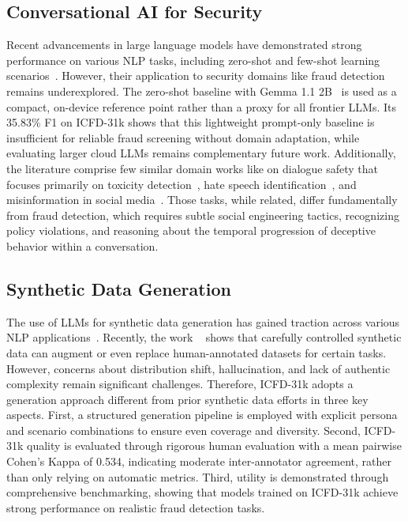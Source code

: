\documentclass{article}
\newcommand{\crchange}[1]{{\color{blue}#1}}
\begin{document}
\subsection{Conversational AI for Security}
Recent advancements in large language models have demonstrated strong performance on various NLP tasks, including zero-shot and few-shot learning scenarios~\cite{brown2020language,chung2022scaling}. However, their application to security domains like fraud detection remains underexplored. \crchange{The zero-shot baseline with Gemma 1.1 2B~\cite{team2024gemma} is used as a compact, on-device reference point rather than a proxy for all frontier LLMs. Its 35.83\% F1 on ICFD-31k shows that this lightweight prompt-only baseline is insufficient for reliable fraud screening without domain adaptation, while evaluating larger cloud LLMs remains complementary future work.} Additionally, the literature comprise few similar domain works like on dialogue safety that focuses primarily on toxicity detection~\cite{zhang2018conversations}, hate speech identification~\cite{davidson2017automated}, and misinformation in social media~\cite{shu2017fake}. Those tasks, while related, differ fundamentally from fraud detection, which requires subtle social engineering tactics, recognizing policy violations, and reasoning about the temporal progression of deceptive behavior within a conversation.

\subsection{Synthetic Data Generation}

The use of LLMs for synthetic data generation has gained traction across various NLP applications~\cite{puri2020training,schick2021generating}. Recently, the work ~\cite{ye2022zerogen} shows that carefully controlled synthetic data can augment or even replace human-annotated datasets for certain tasks. However, concerns about distribution shift, hallucination, and lack of authentic complexity remain significant challenges. Therefore, ICFD-31k adopts a generation approach different from prior synthetic data efforts in three key aspects. First, a structured generation pipeline is employed with explicit persona and scenario combinations to ensure even coverage and diversity. Second, ICFD-31k quality is evaluated through rigorous human evaluation with a mean pairwise Cohen's Kappa of 0.534, indicating moderate inter-annotator agreement, rather than only relying on automatic metrics. Third, utility is demonstrated through comprehensive benchmarking, showing that models trained on ICFD-31k achieve strong performance on realistic fraud detection tasks.
\end{document}
